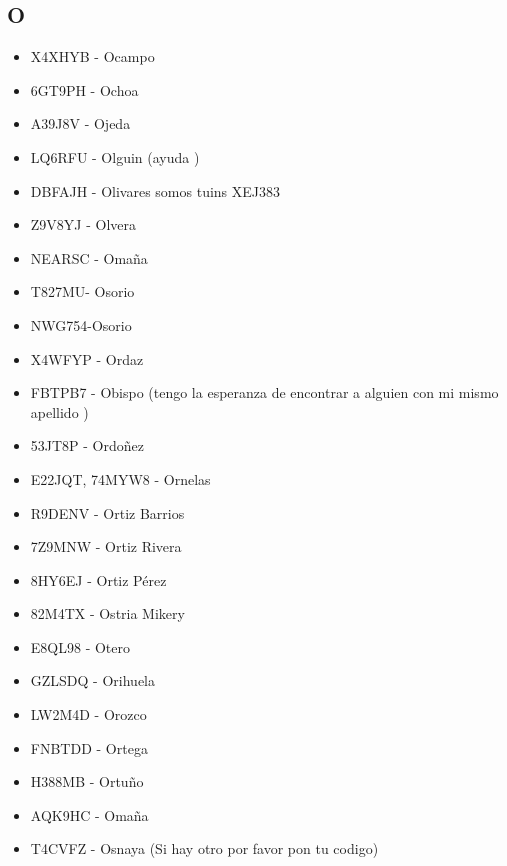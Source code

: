 \subsection*{O}
\begin{itemize}[leftmargin=*,nosep]
\item X4XHYB - Ocampo
\item 6GT9PH  -  Ochoa
\item A39J8V  -  Ojeda
\item LQ6RFU - Olguin  (ayuda )
\item DBFAJH  -  Olivares somos tuins XEJ383
\item Z9V8YJ - Olvera
\item NEARSC - Omaña
\item T827MU- Osorio
\item NWG754-Osorio
\item X4WFYP  -  Ordaz
\item FBTPB7 - Obispo (tengo la esperanza de encontrar a alguien con mi mismo apellido )
\item 53JT8P - Ordoñez
\item E22JQT, 74MYW8  -  Ornelas
\item R9DENV - Ortiz Barrios
\item 7Z9MNW - Ortiz Rivera
\item 8HY6EJ  -  Ortiz Pérez
\item 82M4TX - Ostria Mikery
\item E8QL98 - Otero
\item GZLSDQ - Orihuela
\item LW2M4D - Orozco
\item FNBTDD - Ortega
\item H388MB - Ortuño
\item AQK9HC - Omaña
\item T4CVFZ - Osnaya (Si hay otro por favor pon tu codigo)
\end{itemize}

